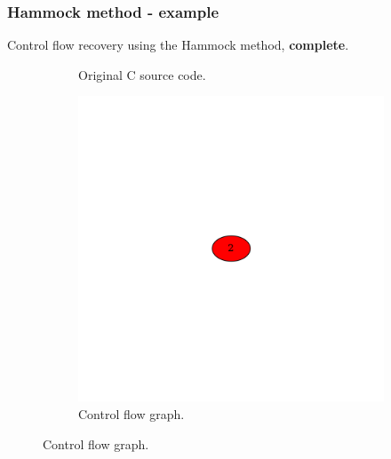 \documentclass[aspectratio=1610]{beamer}
\begin{document}
\begin{frame}
	\frametitle{Hammock method - example}
	Control flow recovery using the Hammock method, \textbf{complete}.
	\begin{figure}[htbp]
		\centering
		\begin{subfigure}[b]{0.30\textwidth}
			\centering
			
			\caption{Original C source code.}
		\end{subfigure}
		\begin{subfigure}[b]{0.50\textwidth}
			\centering
			\includegraphics[height=0.6\paperheight]{inc/methods/hammock/example/without-break/main_0004b.png}
			\caption{Control flow graph.}
		\end{subfigure}
	\end{figure}
\end{frame}


\end{document}
